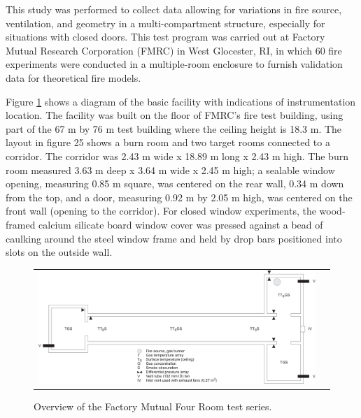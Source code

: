 This study was performed to collect data allowing for variations in fire source, ventilation, and geometry in a multi-compartment structure, especially for situations with closed doors. This test program was carried out at Factory Mutual Research Corporation (FMRC) in West Glocester, RI, in which 60 fire experiments were conducted in a multiple-room enclosure to furnish validation data for theoretical fire models.

Figure \ref{fig:FMSummary} shows a diagram of the basic facility with indications of instrumentation location. The facility was built on the floor of FMRC's fire test building, using part of the 67 m by 76 m test building where the ceiling height is 18.3 m. The layout in figure 25 shows a burn room and two target rooms connected to a corridor. The corridor was 2.43 m wide x 18.89 m long x 2.43 m high. The burn room measured 3.63 m deep x 3.64 m wide x 2.45 m high; a sealable window opening, measuring 0.85 m square, was centered on the rear wall, 0.34 m down from the top, and a door, measuring 0.92 m by 2.05 m high, was centered on the front wall (opening to the corridor). For closed window experiments, the wood-framed calcium silicate board window cover was pressed against a bead of caulking around the steel window frame and held by drop bars positioned into slots on the outside wall.

\begin{figure}[h]
\begin{center}
\begin{tabular}{cc}
\includegraphics[width=6.0in]{FIGURES/FM_NBS/FMSummary}\\
\end{tabular}
\end{center}
\caption{Overview of the {F}actory {M}utual Four Room test series.}
 \label{fig:FMSummary}
\end{figure}

